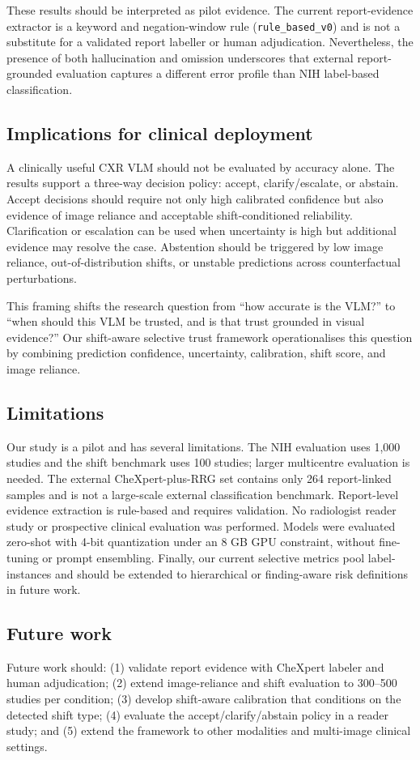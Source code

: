 These results should be interpreted as pilot evidence. The current report-evidence extractor is a keyword and negation-window rule (\texttt{rule\_based\_v0}) and is not a substitute for a validated report labeller or human adjudication. Nevertheless, the presence of both hallucination and omission underscores that external report-grounded evaluation captures a different error profile than NIH label-based classification.

\subsection{Implications for clinical deployment}

A clinically useful CXR VLM should not be evaluated by accuracy alone. The results support a three-way decision policy: accept, clarify/escalate, or abstain. Accept decisions should require not only high calibrated confidence but also evidence of image reliance and acceptable shift-conditioned reliability. Clarification or escalation can be used when uncertainty is high but additional evidence may resolve the case. Abstention should be triggered by low image reliance, out-of-distribution shifts, or unstable predictions across counterfactual perturbations.

This framing shifts the research question from “how accurate is the VLM?” to “when should this VLM be trusted, and is that trust grounded in visual evidence?” Our shift-aware selective trust framework operationalises this question by combining prediction confidence, uncertainty, calibration, shift score, and image reliance.

\subsection{Limitations}

Our study is a pilot and has several limitations. The NIH evaluation uses 1,000 studies and the shift benchmark uses 100 studies; larger multicentre evaluation is needed. The external CheXpert-plus-RRG set contains only 264 report-linked samples and is not a large-scale external classification benchmark. Report-level evidence extraction is rule-based and requires validation. No radiologist reader study or prospective clinical evaluation was performed. Models were evaluated zero-shot with 4-bit quantization under an 8 GB GPU constraint, without fine-tuning or prompt ensembling. Finally, our current selective metrics pool label-instances and should be extended to hierarchical or finding-aware risk definitions in future work.

\subsection{Future work}

Future work should: (1) validate report evidence with CheXpert labeler and human adjudication; (2) extend image-reliance and shift evaluation to 300--500 studies per condition; (3) develop shift-aware calibration that conditions on the detected shift type; (4) evaluate the accept/clarify/abstain policy in a reader study; and (5) extend the framework to other modalities and multi-image clinical settings.

